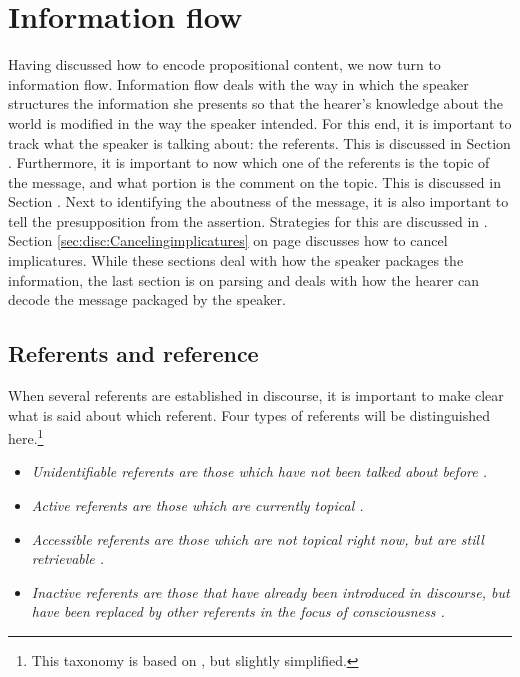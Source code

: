 \chapter{Information flow}\label{sec:Informationflow}
Having discussed how to encode propositional content, we now turn to information flow.
Information flow deals with the way in which the speaker structures the information she presents so that the hearer's knowledge about the world is modified in the way the speaker intended. For this end, it is important to track what the speaker is talking about: the referents. This is discussed in Section . Furthermore, it is important to now which one of the referents is the topic of the message, and what portion is the comment on the topic. This is discussed in Section . Next to identifying the aboutness of the message, it is also important to tell the presupposition from the assertion. Strategies for this are discussed in .
Section \ref{sec:disc:Cancelingimplicatures} on page \pageref{sec:disc:Cancelingimplicatures}  discusses how to cancel implicatures. While these sections deal with how the speaker packages the information, the last section   is on parsing and deals with how the hearer can decode the message packaged by the speaker.

\section{Referents and reference}\label{sec:disc:Referentsandreference}
When several referents are established in discourse, it is important to make clear what is said about which referent. Four types of referents will be distinguished here.\footnote{This taxonomy is based on \citet{Prince1981, Chafe1987, Lambrecht1994, VanValinEtAl1997rrg}, but slightly simplified.}
\begin{itemize}
 \item \em Unidentifiable \em referents are those which have not been talked about before .
 \item \em Active \em referents are those which are currently topical .
 \item \em Accessible \em referents are those which are not topical right now, but are still retrievable .
 \item \em Inactive \em referents are those that have already been introduced in discourse, but have been replaced by other referents in the focus of consciousness .
\end{itemize}






